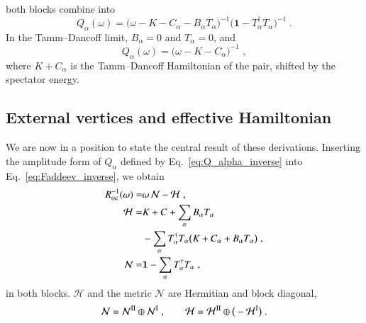 \documentclass[aip,jcp,reprint,noshowkeys,superscriptaddress]{revtex4-1}
\newcommand{\bI}{\boldsymbol{1}}
\begin{document}
both blocks combine into
\begin{equation}
Q_\alpha(\omega)
=
\big(\omega-K-C_\alpha-B_\alpha T_\alpha\big)^{-1}
\big(\bI-T_\alpha^\dagger T_\alpha\big)^{-1} \;.
\label{eq:Q_alpha_inverse}
\end{equation}
In the Tamm--Dancoff limit, $B_\alpha=0$ and $T_\alpha=0$, and
\begin{equation}
Q_\alpha(\omega)
=
\big(\omega-K-C_\alpha\big)^{-1} \;,
\label{eq:Q_TDA}
\end{equation}
where $K+C_\alpha$ is the Tamm--Dancoff Hamiltonian of the pair,
shifted by the spectator energy.

\subsection{External vertices and effective Hamiltonian}
\label{sec:ext_vertices}
We are now in a position to state the central result of 
these derivations.
Inserting the amplitude form of $Q_\alpha$ defined by
Eq.~\eqref{eq:Q_alpha_inverse} into Eq.~\eqref{eq:Faddeev_inverse},
we obtain
\begin{equation}
	\begin{aligned}
R_{\rm oc}^{-1}(\omega)
= &
\omega\, \mathcal N -\mathcal H \;, \\
\mathcal H 
= &
K+C
+\sum_\alpha B_\alpha T_\alpha
 \\
&-\sum_\alpha T_\alpha^\dagger T_\alpha
\big(K+C_\alpha+B_\alpha T_\alpha\big) \;,
\\
\mathcal N
= &
\bI-\sum_\alpha T_\alpha^\dagger T_\alpha \;,
\label{eq:depth1_amplitudes}
\end{aligned} 
\end{equation}
in both blocks. $\mathcal H$ and the metric $\mathcal N$ are Hermitian
and block diagonal,
\begin{equation}
\mathcal N=\mathcal N^{\rm II}\oplus\mathcal N^{\rm I} \;,
\qquad
\mathcal H=\mathcal H^{\rm II}\oplus\big(-\mathcal H^{\rm I}\big) \;.
\nonumber
\end{equation}
\end{document}
